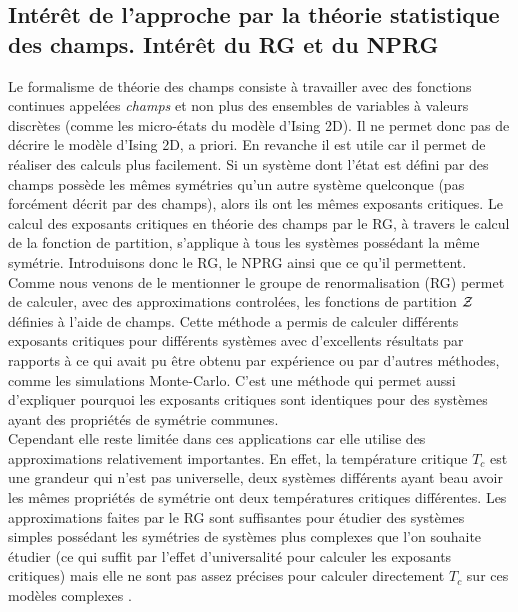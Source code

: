 \documentclass[10.5pt]{article}
\begin{document}
\begin{multicols*}{2}
\subsection{Intérêt de l'approche par la théorie statistique des champs. Intérêt du RG et du NPRG}


Le formalisme de théorie des champs consiste à travailler avec des fonctions continues appelées \textit{champs} et non plus des ensembles de variables à valeurs discrètes (comme les micro-états du modèle d'Ising 2D). Il ne permet donc pas de décrire le modèle d'Ising 2D, a priori. En revanche il est utile car il permet de réaliser des calculs plus facilement. Si un système dont l'état est défini par des champs possède les mêmes symétries qu'un autre système quelconque (pas forcément décrit par des champs), alors ils ont les mêmes exposants critiques. Le calcul des exposants critiques en théorie des champs par le RG, à travers le calcul de la fonction de partition, s'applique à tous les systèmes possédant la même symétrie. Introduisons donc le RG, le NPRG ainsi que ce qu'il permettent. \\

Comme nous venons de le mentionner le groupe de renormalisation (RG) permet de calculer, avec des approximations controlées, les fonctions de partition $\mathcal{Z}$ définies à l'aide de champs. Cette méthode a permis de calculer différents exposants critiques pour différents systèmes avec d'excellents résultats \cite{kadanoff1967scaling, wilson1971renormalization2} par rapports à ce qui avait pu être obtenu par expérience ou par d'autres méthodes, comme les simulations Monte-Carlo. C'est une méthode qui permet aussi d'expliquer pourquoi les exposants critiques sont identiques pour des systèmes ayant des propriétés de symétrie communes. \\
\indent
Cependant elle reste limitée dans ces applications car elle utilise des approximations relativement importantes. En effet, la température critique $T_c$ est une grandeur qui n'est pas universelle, deux systèmes différents ayant beau avoir les mêmes propriétés de symétrie ont deux températures critiques différentes. Les approximations faites par le RG sont suffisantes pour étudier des systèmes simples possédant les symétries de systèmes plus complexes que l'on souhaite étudier (ce qui suffit par l'effet d'universalité pour calculer les exposants critiques) mais elle ne sont pas assez précises pour calculer directement $T_c$ sur ces modèles complexes .\\


\end{multicols*}
\end{document}
